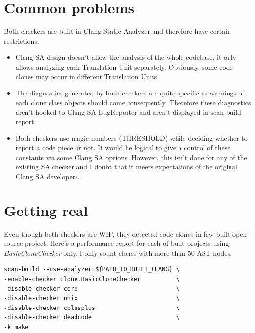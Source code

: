 \documentclass[a0,portrait]{a0poster}
\begin{document}
\begin{multicols}{2}
\section*{Common problems}

Both checkers are built in Clang Static Analyzer and therefore have certain restrictions.

\begin{itemize}
  \item Clang SA design doesn't allow the analysis of the whole codebase, it only allows
  analyzing each Translation Unit separately. Obviously, some code clones may occur in
  different Translation Units.
  \item The diagnostics generated by both checkers are quite specific as warnings of each
  clone class objects should come consequently. Therefore these diagnostics aren't hooked
  to Clang SA BugReporter and aren't displayed in scan-build report.
  \item Both checkers use magic numbers (THRESHOLD) while deciding whether to report a
  code piece or not. It would be logical to give a control of these constants via some
  Clang SA options. However, this isn't done for any of the existing SA checker and I
  doubt that it meets expectations of the original Clang SA developers.
\end{itemize}


\section*{Getting real}

Even though both checkers are WIP, they detected code clones in few built open-source
project. Here's a performance report for each of built projects using
\textit{BasicCloneChecker} only. I only count clones with more than 50 AST nodes.

\begin{lstlisting}[frame=single]
scan-build --use-analyzer=${PATH_TO_BUILT_CLANG} \
-enable-checker clone.BasicCloneChecker          \
-disable-checker core                            \
-disable-checker unix                            \
-disable-checker cplusplus                       \
-disable-checker deadcode                        \
-k make
\end{lstlisting}


\end{multicols}
\end{document}
